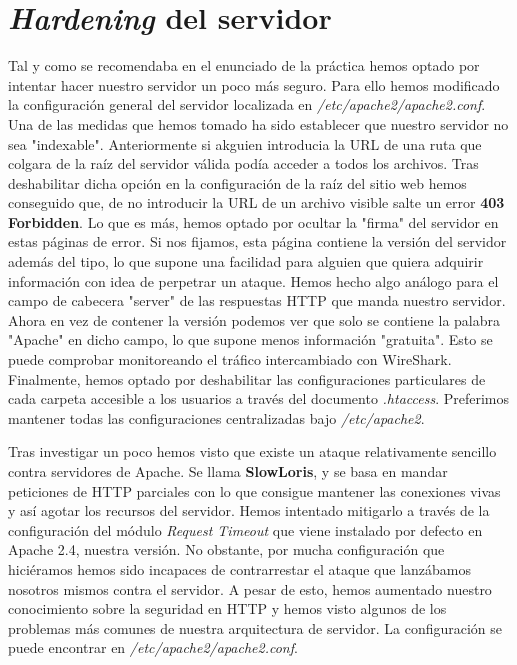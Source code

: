 \documentclass{article}[13pt]
\begin{document}
  \section{\textit{Hardening} del servidor}
    Tal y como se recomendaba en el enunciado de la práctica hemos optado por intentar hacer nuestro servidor un poco más seguro. Para ello hemos modificado la configuración general del servidor localizada en \textit{/etc/apache2/apache2.conf}. Una de las medidas que hemos tomado ha sido establecer que nuestro servidor no sea "indexable". Anteriormente si akguien introducia la URL de una ruta que colgara de la raíz del servidor válida podía acceder a todos los archivos. Tras deshabilitar dicha opción en la configuración de la raíz del sitio web hemos conseguido que, de no introducir la URL de un archivo visible salte un error \textbf{403 Forbidden}. Lo que es más, hemos optado por ocultar la "firma" del servidor en estas páginas de error. Si nos fijamos, esta página contiene la versión del servidor además del tipo, lo que supone una facilidad para alguien que quiera adquirir información con idea de perpetrar un ataque. Hemos hecho algo análogo para el campo de cabecera "server" de las respuestas HTTP que manda nuestro servidor. Ahora en vez de contener la versión podemos ver que solo se contiene la palabra "Apache" en dicho campo, lo que supone menos información "gratuita". Esto se puede comprobar monitoreando el tráfico intercambiado con WireShark. Finalmente, hemos optado por deshabilitar las configuraciones particulares de cada carpeta accesible a los usuarios a través del documento \textit{.htaccess}. Preferimos mantener todas las configuraciones centralizadas bajo \textit{/etc/apache2}.

    Tras investigar un poco hemos visto que existe un ataque relativamente sencillo contra servidores de Apache. Se llama \textbf{SlowLoris}, y se basa en mandar peticiones de HTTP parciales con lo que consigue mantener las conexiones vivas y así agotar los recursos del servidor. Hemos intentado mitigarlo a través de la configuración del módulo \textit{Request Timeout} que viene instalado por defecto en Apache 2.4, nuestra versión. No obstante, por mucha configuración que hiciéramos hemos sido incapaces de contrarrestar el ataque que lanzábamos nosotros mismos contra el servidor. A pesar de esto, hemos aumentado nuestro conocimiento sobre la seguridad en HTTP y hemos visto algunos de los problemas más comunes de nuestra arquitectura de servidor. La configuración se puede encontrar en \textit{/etc/apache2/apache2.conf}.
\end{document}
